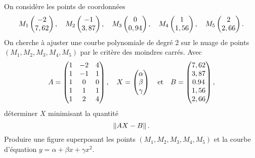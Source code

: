   On considère les points de coordonnées 
  \begin{equation*}
    M_1 \begin{pmatrix} -2 \\ 7,62 \end{pmatrix},\quad M_2 \begin{pmatrix} -1 \\ 3,87 \end{pmatrix},\quad M_3 \begin{pmatrix} 0 \\ 0,94 \end{pmatrix},\quad M_4 \begin{pmatrix} 1\\1,56 \end{pmatrix},\quad M_5\begin{pmatrix} 2 \\ 2,66 \end{pmatrix}.
  \end{equation*}
  On cherche à ajuster une courbe polynomiale de degré $2$ sur le nuage de points $(M_1,M_2,M_3,M_4,M_5)$ par le critère des moindres carrés. Avec 
  \begin{equation*}
    A = \begin{pmatrix} 1 & -2 & 4 \\ 1 & -1 & 1 \\ 1 & 0 & 0 \\ 1 & 1 & 1\\ 1 & 2 & 4\end{pmatrix}, \quad X = \begin{pmatrix} \alpha \\ \beta \\ \gamma \end{pmatrix} \quad\textrm{et} \quad B = \begin{pmatrix} 7,62 \\ 3,87 \\ 0.94 \\ 1,56 \\ 2,66 \end{pmatrix},
  \end{equation*}
  déterminer $X$ minimisant la quantité 
  \begin{equation*}
    \left\Vert {AX-B}\right\Vert. 
  \end{equation*}
  Produire une figure superposant les points $(M_1,M_2,M_3,M_4,M_5)$ et la courbe d'équation $y = \alpha + \beta x + \gamma x^2$. 

